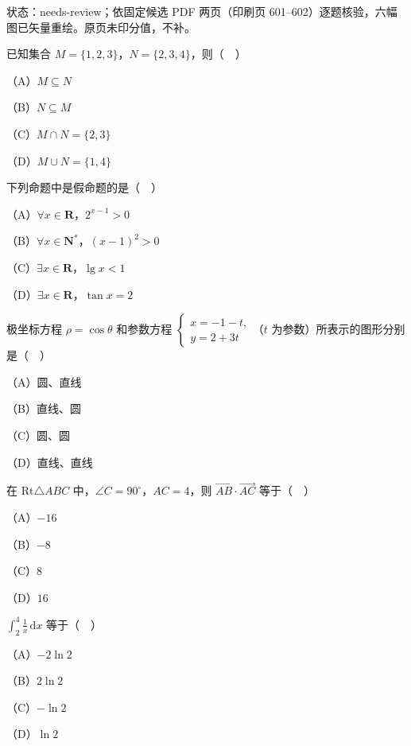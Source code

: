 状态：needs-review；依固定候选 PDF 两页（印刷页 601–602）逐题核验，六幅图已矢量重绘。原页未印分值，不补。
\begin{question}
已知集合 $M=\{1,2,3\}$，$N=\{2,3,4\}$，则（　）

（A）$M\subseteq N$

（B）$N\subseteq M$

（C）$M\cap N=\{2,3\}$

（D）$M\cup N=\{1,4\}$

\end{question}
\begin{question}
下列命题中是假命题的是（　）

（A）$\forall x\in\mathbf R$，$2^{x-1}>0$

（B）$\forall x\in\mathbf N^*$，$(x-1)^2>0$

（C）$\exists x\in\mathbf R$，$\lg x<1$

（D）$\exists x\in\mathbf R$，$\tan x=2$

\end{question}
\begin{question}
极坐标方程 $\rho=\cos\theta$ 和参数方程 $\begin{cases}x=-1-t,\\ y=2+3t\end{cases}$（$t$ 为参数）所表示的图形分别是（　）

（A）圆、直线

（B）直线、圆

（C）圆、圆

（D）直线、直线

\end{question}
\begin{question}
在 $\mathrm{Rt}\triangle ABC$ 中，$\angle C=90^\circ$，$AC=4$，则 $\overrightarrow{AB}\cdot\overrightarrow{AC}$ 等于（　）

（A）$-16$

（B）$-8$

（C）$8$

（D）$16$

\end{question}
\begin{question}
$\displaystyle\int_2^4\frac1x\,\mathrm dx$ 等于（　）

（A）$-2\ln2$

（B）$2\ln2$

（C）$-\ln2$

（D）$\ln2$

\end{question}
